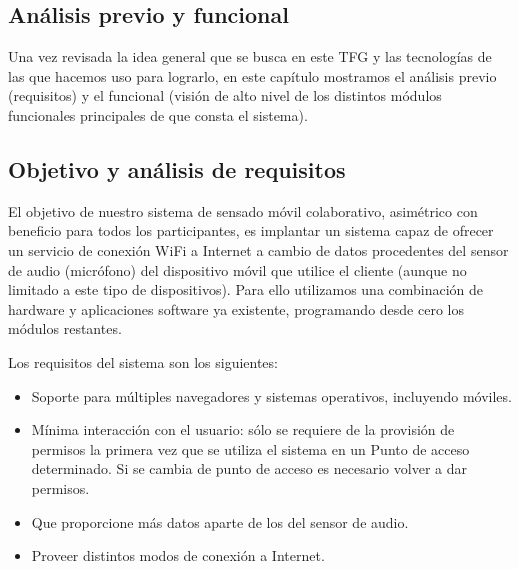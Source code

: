 \clearpage
{}%
\begin{center}
\begin{minipage}{.75\textwidth}
\section{Análisis previo y funcional}

Una vez revisada la idea general que se busca en este TFG y las tecnologías de las que hacemos uso para lograrlo, en este capítulo mostramos el análisis previo (requisitos) y el funcional (visión de alto nivel de los distintos módulos funcionales principales de que consta el sistema). %
\end{minipage}
\end{center}
\clearpage%

\subsection{Objetivo y análisis de requisitos}
El objetivo de nuestro sistema de sensado móvil colaborativo, asimétrico con beneficio para todos los participantes, es implantar un sistema capaz de ofrecer un servicio de conexión WiFi a Internet a cambio de datos procedentes del sensor de audio (micrófono) del dispositivo móvil que utilice el cliente (aunque no limitado a este tipo de dispositivos). Para ello utilizamos una combinación de hardware y aplicaciones software ya existente, programando desde cero los módulos restantes.

Los requisitos del sistema son los siguientes:

\begin{itemize}
\item Soporte para múltiples navegadores y sistemas operativos, incluyendo móviles.
\item Mínima interacción con el usuario: sólo se requiere de la provisión de permisos la primera vez que se utiliza el sistema en un Punto de acceso determinado. Si se cambia de punto de acceso es necesario volver a dar permisos.
\item Que proporcione más datos aparte de los del sensor de audio.
\item Proveer distintos modos de conexión a Internet.
\end{itemize}

